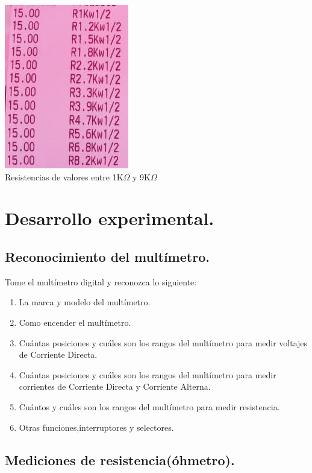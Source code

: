 \documentclass[10pt]{article}
\begin{document}
\begin{multicols}{2}
\begin{center}
	\includegraphics[scale = 1]{Imagenes/Material/Resistencias.jpeg}\\
	Resistencias de valores entre 1K$\Omega$ y 9K$\Omega$

\end{center}


\section{Desarrollo experimental.}

\subsection{Reconocimiento del multímetro.}

Tome el multímetro digital y reconozca lo siguiente:
\begin{enumerate}
	\item La marca y modelo del multímetro.
	\item Como encender el multímetro.
	\item Cuántas posiciones y cuáles son los rangos del multímetro para medir voltajes de Corriente Directa.
	\item Cuántas posiciones y cuáles son los rangos del multímetro para medir corrientes de Corriente Directa y Corriente Alterna.
	\item Cuántos y cuáles son los rangos del multímetro para medir resistencia.
	\item Otras funciones,interruptores y selectores.
\end{enumerate}

\subsection{Mediciones de resistencia(óhmetro).}


\end{multicols}
\end{document}
